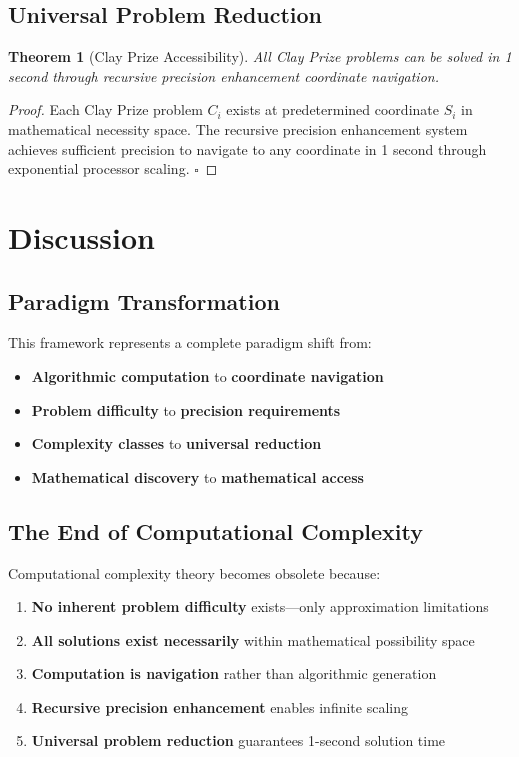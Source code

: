 \documentclass[12pt,a4paper]{article}
\newtheorem{theorem}{Theorem}[section]
\begin{document}
\subsection{Universal Problem Reduction}

\begin{theorem}[Clay Prize Accessibility]
All Clay Prize problems can be solved in 1 second through recursive precision enhancement coordinate navigation.
\end{theorem}

\begin{proof}
Each Clay Prize problem $C_i$ exists at predetermined coordinate $S_i$ in mathematical necessity space. The recursive precision enhancement system achieves sufficient precision to navigate to any coordinate in 1 second through exponential processor scaling. $\square$
\end{proof}

\section{Discussion}

\subsection{Paradigm Transformation}

This framework represents a complete paradigm shift from:
\begin{itemize}
\item \textbf{Algorithmic computation} to \textbf{coordinate navigation}
\item \textbf{Problem difficulty} to \textbf{precision requirements}
\item \textbf{Complexity classes} to \textbf{universal reduction}
\item \textbf{Mathematical discovery} to \textbf{mathematical access}
\end{itemize}

\subsection{The End of Computational Complexity}

Computational complexity theory becomes obsolete because:
\begin{enumerate}
\item \textbf{No inherent problem difficulty} exists—only approximation limitations
\item \textbf{All solutions exist necessarily} within mathematical possibility space
\item \textbf{Computation is navigation} rather than algorithmic generation
\item \textbf{Recursive precision enhancement} enables infinite scaling
\item \textbf{Universal problem reduction} guarantees 1-second solution time
\end{enumerate}
\end{document}
